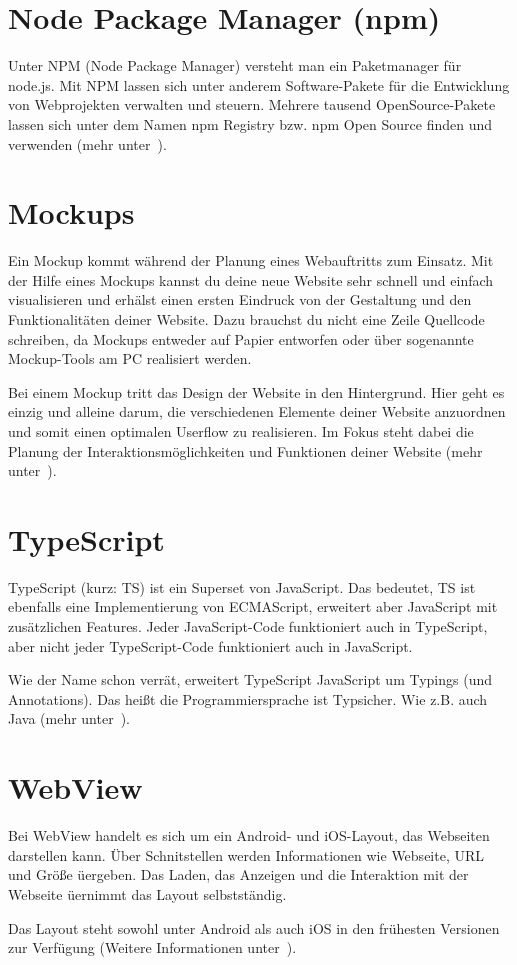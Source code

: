 \section{Node Package Manager (npm)}
Unter NPM (Node Package Manager) versteht man ein Paketmanager für node.js. Mit NPM lassen sich unter anderem
Software-Pakete für die Entwicklung von Webprojekten verwalten und steuern. Mehrere tausend OpenSource-Pakete lassen sich
unter dem Namen npm Registry bzw. npm Open Source finden und verwenden (mehr unter~\cite{book_grundlagen_npm}).

\section{Mockups}
Ein Mockup kommt während der Planung eines Webauftritts zum Einsatz. Mit der Hilfe eines Mockups kannst du deine neue
Website sehr schnell und einfach visualisieren und erhälst einen ersten Eindruck von der Gestaltung und den
Funktionalitäten deiner Website. Dazu brauchst du nicht eine Zeile Quellcode schreiben, da Mockups entweder auf Papier
entworfen oder über sogenannte Mockup-Tools am PC realisiert werden.

Bei einem Mockup tritt das Design der Website in den Hintergrund. Hier geht es einzig und alleine darum, die
verschiedenen Elemente deiner Website anzuordnen und somit einen optimalen Userflow zu realisieren. Im Fokus steht
dabei die Planung der Interaktionsmöglichkeiten und Funktionen deiner Website (mehr unter~\cite{book_grundlagen_mockups}).

\section{TypeScript}
TypeScript (kurz: TS) ist ein Superset von JavaScript. Das bedeutet, TS ist ebenfalls eine Implementierung von ECMAScript,
erweitert aber JavaScript mit zusätzlichen Features. Jeder JavaScript-Code funktioniert auch in TypeScript, aber nicht
jeder TypeScript-Code funktioniert auch in JavaScript.

Wie der Name schon verrät, erweitert TypeScript JavaScript um Typings (und Annotations). Das heißt die Programmiersprache
ist Typsicher. Wie z.B. auch Java (mehr unter~\cite{book_grundlagen_typescript}).

\section{WebView}
Bei WebView handelt es sich um ein Android- und iOS-Layout, das Webseiten darstellen kann. Über Schnitstellen werden
Informationen wie Webseite, URL und Größe üergeben. Das Laden, das Anzeigen und die Interaktion mit der Webseite üernimmt
das Layout selbstständig.

Das Layout steht sowohl unter Android als auch iOS in den frühesten Versionen zur Verfügung (Weitere Informationen
unter~\cite{online_grundlagen_webview}).